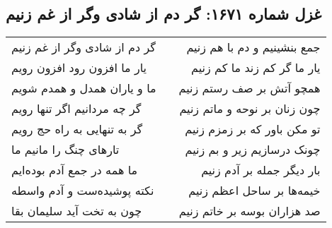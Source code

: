\begin{center}
\section*{غزل شماره ۱۶۷۱: گر دم از شادی وگر از غم زنیم}
\label{sec:1671}
\begin{longtable}{l p{0.5cm} r}
گر دم از شادی وگر از غم زنیم
&&
جمع بنشینیم و دم با هم زنیم
\\
یار ما افزون رود افزون رویم
&&
یار ما گر کم زند ما کم زنیم
\\
ما و یاران همدل و همدم شویم
&&
همچو آتش بر صف رستم زنیم
\\
گر چه مردانیم اگر تنها رویم
&&
چون زنان بر نوحه و ماتم زنیم
\\
گر به تنهایی به راه حج رویم
&&
تو مکن باور که بر زمزم زنیم
\\
تارهای چنگ را مانیم ما
&&
چونک درسازیم زیر و بم زنیم
\\
ما همه در جمع آدم بوده‌ایم
&&
بار دیگر جمله بر آدم زنیم
\\
نکته پوشیده‌ست و آدم واسطه
&&
خیمه‌ها بر ساحل اعظم زنیم
\\
چون به تخت آید سلیمان بقا
&&
صد هزاران بوسه بر خاتم زنیم
\\
\end{longtable}
\end{center}
